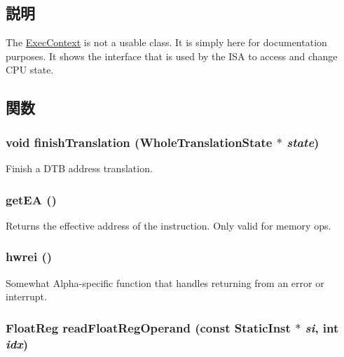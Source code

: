 \subsection{説明}
The \hyperlink{classExecContext}{ExecContext} is not a usable class. It is simply here for documentation purposes. It shows the interface that is used by the ISA to access and change CPU state. 

\subsection{関数}
\hypertarget{classExecContext_a36c2a28eca3086b67fc7168a37367e98}{
\subsubsection[{finishTranslation}]{\setlength{\rightskip}{0pt plus 5cm}void finishTranslation ({\bf WholeTranslationState} $\ast$ {\em state})}}
\label{classExecContext_a36c2a28eca3086b67fc7168a37367e98}
Finish a DTB address translation. \hypertarget{classExecContext_a840be0f7fe0a7a50b37b0552fe6ca506}{
\subsubsection[{getEA}]{ getEA ()}}
\label{classExecContext_a840be0f7fe0a7a50b37b0552fe6ca506}
Returns the effective address of the instruction. Only valid for memory ops. \hypertarget{classExecContext_a5f42e07ae335dff417664e91518c7f1e}{
\subsubsection[{hwrei}]{ hwrei ()}}
\label{classExecContext_a5f42e07ae335dff417664e91518c7f1e}
Somewhat Alpha-\/specific function that handles returning from an error or interrupt. \hypertarget{classExecContext_a717c88c8c56d79c9ed554ba5992bd8c3}{
\subsubsection[{readFloatRegOperand}]{\setlength{\rightskip}{0pt plus 5cm}FloatReg readFloatRegOperand (const {\bf StaticInst} $\ast$ {\em si}, \/  int {\em idx})}}
